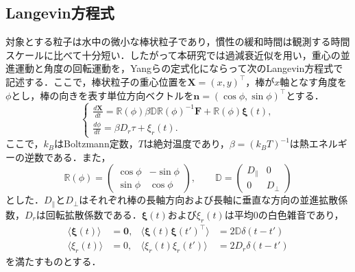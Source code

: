 \documentclass[dvipdfmx]{ampbt}
\begin{document}
  \subsection{Langevin方程式}
  \label{subsec:langevin}
  対象とする粒子は水中の微小な棒状粒子であり，慣性の緩和時間は観測する時間スケールに比べて十分短い．したがって本研究では過減衰近似を用い，重心の並進運動と角度の回転運動を，Yangら\cite{yang2019}の定式化にならって次のLangevin方程式で記述する．ここで，棒状粒子の重心位置を$\bm{X}=(x,y)^\top$，棒が$x$軸となす角度を$\phi$とし，棒の向きを表す単位方向ベクトルを$\bm{n}=(\cos\phi,\sin\phi)^\top$とする．
  \begin{equation}
    \begin{cases}
      \displaystyle
      \frac{d\bm{X}}{dt}
      =\mathbb{R}(\phi)\beta\mathbb{D}\mathbb{R}(\phi)^{-1}\bm{F}
      +\mathbb{R}(\phi)\bm{\xi}(t), \\[6pt]
      \displaystyle
      \frac{d\phi}{dt}
      =\beta D_r\tau+\xi_r(t).
    \end{cases}
    \label{eq:langevin}
  \end{equation}
  ここで，$k_B$はBoltzmann定数，$T$は絶対温度であり，$\beta=(k_BT)^{-1}$は熱エネルギーの逆数である．また，
  \begin{equation}
    \mathbb{R}(\phi)=
    \begin{pmatrix}
      \cos\phi & -\sin\phi \\
      \sin\phi & \cos\phi
    \end{pmatrix},\qquad
    \mathbb{D}=
    \begin{pmatrix}
      D_{\parallel} & 0         \\
      0             & D_{\perp}
    \end{pmatrix}
  \end{equation}
  とした．$D_{\parallel}$と$D_{\perp}$はそれぞれ棒の長軸方向および長軸に垂直な方向の並進拡散係数，$D_r$は回転拡散係数である．$\bm{\xi}(t)$および$\xi_r(t)$は平均0の白色雑音であり，
  \begin{align}
    \langle \bm{\xi}(t)\rangle                  & = \bm{0},                &
    \langle \bm{\xi}(t)\bm{\xi}(t')^\top\rangle & =2\mathbb{D}\delta(t-t')   \\
    \langle \xi_r(t)\rangle                     & =0,                      &
    \langle \xi_r(t)\xi_r(t')\rangle            & = 2D_r\delta(t-t')
  \end{align}
  を満たすものとする．
\end{document}
